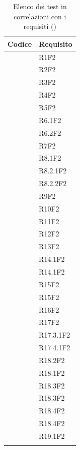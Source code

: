 	\setcounter{tableCounter}{1}
	\begin{table}[H]
		\centering
		{\def\arraystretch{1.4}
		\begin{tabularx}{0.7\textwidth}{YY}
			\textbf{Codice} & \textbf{Requisito} \\
			\toprule
			\addtotv & R1F2 \\
			\addtotv & R2F2 \\
			\addtotv & R3F2 \\
			\addtotv & R4F2 \\
			\addtotv & R5F2 \\
			\addtotv & R6.1F2 \\
			\addtotv & R6.2F2 \\
			\addtotv & R7F2 \\
			\addtotv & R8.1F2 \\
			\addtotv & R8.2.1F2 \\
			\addtotv & R8.2.2F2 \\
			\addtotv & R9F2 \\
			\addtotv & R10F2 \\
			\addtotv & R11F2 \\
			\addtotv & R12F2 \\
			\addtotv & R13F2 \\
			\addtotv & R14.1F2 \\			
			\addtotv & R14.1F2 \\
			\addtotv & R15F2 \\
			\addtotv & R15F2 \\
			\addtotv & R16F2 \\
			\addtotv & R17F2 \\
			\addtotv & R17.3.1F2 \\
			\addtotv & R17.4.1F2 \\
			\addtotv & R18.2F2 \\
			\addtotv & R18.1F2 \\
			\addtotv & R18.3F2 \\
			\addtotv & R18.3F2 \\
			\addtotv & R18.4F2 \\
			\addtotv & R18.4F2 \\
			\addtotv & R19.1F2 \\
            \bottomrule\\
            \end{tabularx}}
		\caption{Elenco dei test in correlazioni con i requisiti (\thetableCounter)}
	\end{table}

